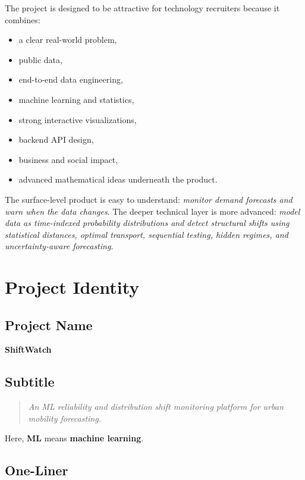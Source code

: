 \documentclass[11pt]{article}
\begin{document}
The project is designed to be attractive for technology recruiters because it combines:

\begin{itemize}
    \item a clear real-world problem,
    \item public data,
    \item end-to-end data engineering,
    \item machine learning and statistics,
    \item strong interactive visualizations,
    \item backend API design,
    \item business and social impact,
    \item advanced mathematical ideas underneath the product.
\end{itemize}

The surface-level product is easy to understand: \textit{monitor demand forecasts and warn when the data changes}. The deeper technical layer is more advanced: \textit{model data as time-indexed probability distributions and detect structural shifts using statistical distances, optimal transport, sequential testing, hidden regimes, and uncertainty-aware forecasting}.

\section{Project Identity}

\subsection{Project Name}

\textbf{ShiftWatch}

\subsection{Subtitle}

\begin{quote}
    \textit{An ML reliability and distribution shift monitoring platform for urban mobility forecasting.}
\end{quote}

Here, \textbf{ML} means \textbf{machine learning}.

\subsection{One-Liner}
\end{document}
